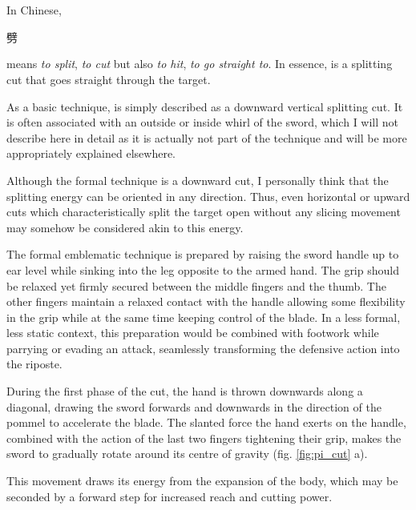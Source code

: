 
\section{\Pi{}}
In Chinese, \Pi{} \begin{CJK*}{UTF8}{bsmi}劈\end{CJK*} means \textit{to split}, \textit{to cut} but also \textit{to hit}, \textit{to go straight to}. In essence, \Pi{} is a splitting cut that goes straight through the target.

As a basic technique, \Pi{} is simply described as a downward vertical splitting cut. It is often associated with an outside or inside whirl of the sword, which I will not describe here in detail as it is actually not part of the \Pi{} technique and will be more appropriately explained elsewhere.

Although the formal \Pi{} technique is a downward cut,  I personally think that the \Pi{} splitting energy can be oriented in any direction. Thus, even horizontal or upward cuts which characteristically split the target open without any slicing movement may somehow be considered akin to this energy.

The formal emblematic \Pi{} technique is prepared by raising the sword handle up to ear level while sinking into the leg opposite to the armed hand. The grip should be relaxed yet firmly secured between the middle fingers and the thumb. The other fingers maintain a relaxed contact with the handle allowing some flexibility in the grip while at the same time keeping control of the blade. 
In a less formal, less static context, this preparation would be combined with footwork while parrying or evading an attack, seamlessly transforming the defensive action into the riposte.

During the first phase of the cut, the hand is thrown downwards along a diagonal, drawing the sword forwards and downwards in the direction of the pommel to accelerate the blade. The slanted force the hand exerts on the handle, combined with the action of the last two fingers tightening their grip, makes the sword to gradually rotate around its centre of gravity (fig. \ref{fig:pi_cut} a).

This movement draws its energy from the expansion of the body, which may be seconded by a forward step for increased reach and cutting power. 

